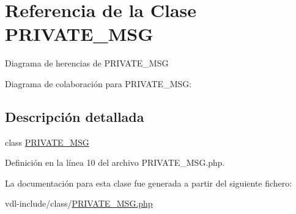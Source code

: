 \hypertarget{classPRIVATE__MSG}{\section{Referencia de la Clase P\-R\-I\-V\-A\-T\-E\-\_\-\-M\-S\-G}
\label{classPRIVATE__MSG}
}


Diagrama de herencias de P\-R\-I\-V\-A\-T\-E\-\_\-\-M\-S\-G


Diagrama de colaboración para P\-R\-I\-V\-A\-T\-E\-\_\-\-M\-S\-G\-:


\subsection{Descripción detallada}
class \hyperlink{classPRIVATE__MSG}{P\-R\-I\-V\-A\-T\-E\-\_\-\-M\-S\-G} 

Definición en la línea 10 del archivo P\-R\-I\-V\-A\-T\-E\-\_\-\-M\-S\-G.\-php.



La documentación para esta clase fue generada a partir del siguiente fichero\-:\begin{DoxyCompactItemize}
\item 
vdl-\/include/class/\hyperlink{PRIVATE__MSG_8php}{P\-R\-I\-V\-A\-T\-E\-\_\-\-M\-S\-G.\-php}\end{DoxyCompactItemize}
